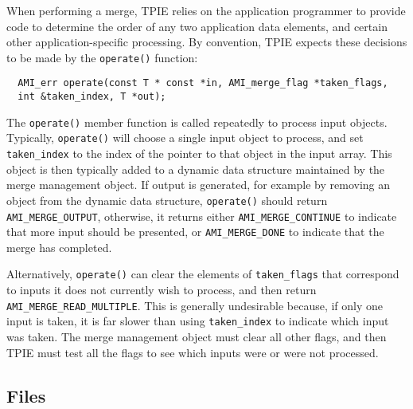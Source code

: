      When performing a merge, TPIE
    relies on the application programmer to provide code to determine
    the order of any two application data elements, and certain other
    application-specific processing. By convention, TPIE expects these
    decisions to be made by the \lstinline|operate()| function:
\begin{lstlisting}
  AMI_err operate(const T * const *in, AMI_merge_flag *taken_flags,
  int &taken_index, T *out);
\end{lstlisting}
The \lstinline|operate()| member function is called repeatedly to
process input objects.  Typically, \lstinline|operate()| will choose a
single input object to process, and set \lstinline|taken_index| to the
index of the pointer to that object in the input array.  This object
is then typically added to a dynamic data structure maintained by the
merge management object.  If output is generated, for example by
removing an object from the dynamic data structure,
\lstinline|operate()| should return \lstinline|AMI_MERGE_OUTPUT|,
otherwise, it returns either \lstinline|AMI_MERGE_CONTINUE| to
indicate that more input should be presented, or
\lstinline|AMI_MERGE_DONE| to indicate that the merge has completed.
    
Alternatively, \lstinline|operate()| can clear the elements of
\lstinline|taken_flags| that correspond to inputs it does not
currently wish to process, and then return
\lstinline|AMI_MERGE_READ_MULTIPLE|.  This is generally undesirable
because, if only one input is taken, it is far slower than using
\lstinline|taken_index| to indicate which input was taken.  The merge
management object must clear all other flags, and then TPIE must test
all the flags to see which inputs were or were not processed.



\clearpage


\subsection{Files}
  \btabb
     {}
  \etabb

